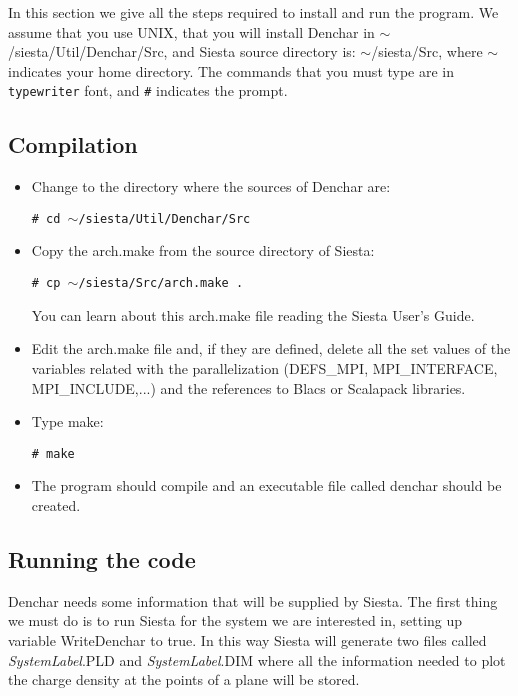 In this section we give all the steps required to install
and run the program. 
We assume that you use UNIX, that you will install {\sc Denchar} in 
$\sim$/siesta/Util/Denchar/Src, and {\sc Siesta} source directory is:
$\sim$/siesta/Src,
 where $\sim$ indicates your home directory.
The commands that you must type are in {\tt typewriter} font, 
and {\tt \#} indicates the prompt.

\subsection{Compilation}

  \begin{itemize}

   \item Change to the directory where the sources of {\sc Denchar} are:

         {\tt \# cd $\sim$/siesta/Util/Denchar/Src}

   \item Copy the arch.make from the source directory of {\sc Siesta}:

         {\tt \# cp $\sim$/siesta/Src/arch.make .}

         You can learn about this arch.make file reading the 
         {\sc Siesta} User's Guide.

   \item Edit the arch.make file and, if they are defined,
         delete all the set values
         of the variables related with the parallelization
         (DEFS\_MPI, MPI\_INTERFACE, MPI\_INCLUDE,...) and
         the references to Blacs or Scalapack libraries.

   \item Type make:

         {\tt \# make}

   \item The program should compile and an executable file called
         denchar should be created.

  \end{itemize}

\subsection{Running the code}

 {\sc Denchar} needs some information that will be supplied by {\sc Siesta}. 
 The first thing we must do is to run {\sc Siesta} for 
 the system we are interested in,
 setting up variable WriteDenchar to true. 
 In this way {\sc Siesta} will generate
 two files called {\it SystemLabel}.PLD and {\it SystemLabel}.DIM
 where all the information 
 needed to plot the charge density at the points of a plane will be stored.

